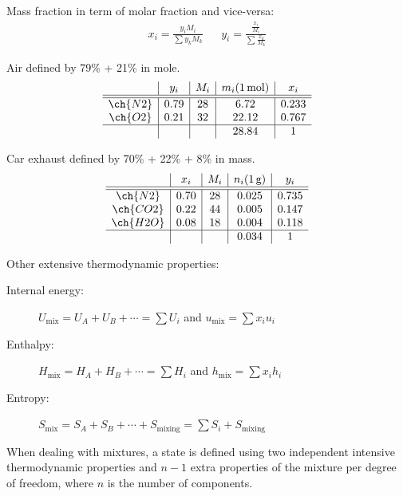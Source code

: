 \documentclass[10pt, twocolumn]{article}
\begin{document}
Mass fraction in term of molar fraction and vice-versa:
\begin{align*}
  x_i = \frac{y_i M_i}{\sum{y_k M_k}} &  & y_i = \frac{\frac{x_i}{M_i}}{\sum{\frac{x_k}{M_k}}}
\end{align*}

\begin{example}
  Air defined by 79\%  + 21\%  in mole.
  \[
    \begin{array}{c|c|c|c|c}
              & y_i  & M_i & m_i (\SI{1}{\mole}) & x_i   \\ \hline\hline
      \ch{N2} & 0.79 & 28  & 6.72                & 0.233 \\
      \ch{O2} & 0.21 & 32  & 22.12               & 0.767 \\ \hline
              &      &     & 28.84               & 1
    \end{array}
  \]
\end{example}

\begin{example}
  Car exhaust defined by 70\%  + 22\%  + 8\%  in mass.
  \[
    \begin{array}{c|c|c|c|c}
               & x_i  & M_i & n_i (\SI{1}{\gram}) & y_i   \\ \hline\hline
      \ch{N2}  & 0.70 & 28  & 0.025               & 0.735 \\
      \ch{CO2} & 0.22 & 44  & 0.005               & 0.147 \\
      \ch{H2O} & 0.08 & 18  & 0.004               & 0.118 \\ \hline
               &      &     & 0.034               & 1
    \end{array}
  \]
\end{example}

Other extensive thermodynamic properties:
\begin{description}
  \item[Internal energy:] \(U_\mathrm{mix} = U_A + U_B + \cdots = \sum{U_i}\) and \(u_\mathrm{mix} = \sum{x_i u_i}\)
  \item[Enthalpy:] \(H_\mathrm{mix} = H_A + H_B + \cdots = \sum{H_i}\) and \(h_\mathrm{mix} = \sum{x_i h_i}\)
  \item[Entropy:] \(S_\mathrm{mix} = S_A + S_B + \cdots + S_\mathrm{mixing} = \sum{S_i} + S_\mathrm{mixing}\)
\end{description}

When dealing with mixtures, a state is defined using two independent intensive thermodynamic properties and \(n - 1\) extra properties of the mixture per degree of freedom, where \(n\) is the number of components.
\end{document}
